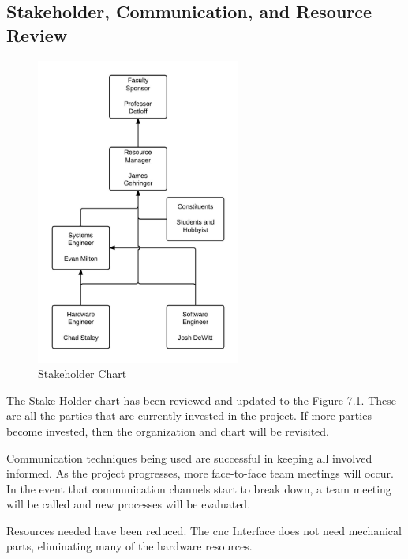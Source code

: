 \subsection{Stakeholder, Communication, and Resource Review}
\begin{figure}[p]
\centering
\includegraphics[width=0.6\textwidth]{shc.jpeg}
\caption{Stakeholder Chart}
\label{fig:Stakeholder Chart}
\end{figure}
The Stake Holder chart has been reviewed and updated to the Figure 7.1.
These are all the parties that are currently invested in the project. 
If more parties become invested, then the organization and chart will be revisited. 

Communication techniques being used are successful in keeping all involved informed.
As the project progresses, more face-to-face team meetings will occur.
In the event that communication channels start to break down, a team meeting will be called and new processes will be evaluated. 

Resources needed have been reduced. 
The \gls{cnc} Interface does not need mechanical parts, eliminating many of the hardware resources.

